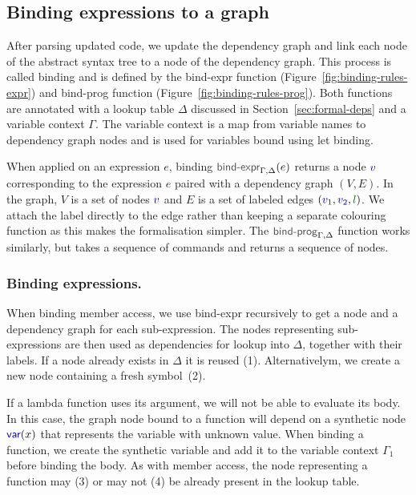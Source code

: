 \documentclass[acmsmall,anonymous,fleqn]{acmart}\settopmatter{printfolios=false,printccs=false,printacmref=false}
\theoremstyle{plain}
\theoremstyle{definition}
\newcommand{\ident}[1]{\textnormal{\textcolor{idclr}{\sffamily #1}}}
\newcommand{\kvd}[1]{\textnormal{\textcolor{kvdclr}{\sffamily #1}}}
\newcommand{\bndclr}[1]{\textcolor{kvdclr}{#1}}
\newcommand{\blblclr}[1]{\textcolor{numclr}{#1}}
\newcommand{\bnd}[1]{\textnormal{\textcolor{kvdclr}{\sffamily #1}}}
\begin{document}
\subsection{Binding expressions to a graph}
\label{sec:formal-bind}

After parsing updated code, we update the dependency graph and link each node of the abstract
syntax tree to a node of the dependency graph. This process is called
binding and is defined by the \ident{bind-expr} function (Figure~\ref{fig:binding-rules-expr})
and \ident{bind-prog} function (Figure~\ref{fig:binding-rules-prog}). Both functions are
annotated with a lookup table $\Delta$ discussed in Section~\ref{sec:formal-deps} and a variable
context $\Gamma$. The variable context is a map from variable names to dependency graph nodes and
is used for variables bound using \kvd{let} binding.

When applied on an expression $e$, binding $\ident{bind-expr}_{\Gamma,\Delta}(e)$ returns
a node $\bndclr{v}$ corresponding to the expression $e$ paired with a dependency graph $(V, E)$.
In the graph, $V$ is a set of nodes $\bndclr{v}$ and $E$ is a set of labeled edges
$(\bndclr{v_1}, \bndclr{v_2}, \blblclr{l})$. We attach the label directly to the edge rather than
keeping a separate colouring function as this makes the formalisation simpler.
The $\ident{bind-prog}_{\Gamma,\Delta}$ function works similarly, but takes a sequence of
commands and returns a sequence of nodes.

\subsubsection{Binding expressions.} When binding member access, we use \ident{bind-expr} recursively
to get a node and a dependency graph for each sub-expression. The nodes representing sub-expressions are
then used as dependencies for lookup into $\Delta$, together with their labels. If a node already
exists in $\Delta$ it is reused (1). Alternativelym, we create a new node containing a fresh symbol~(2).

If a lambda function uses its argument, we will not be able to evaluate its body. In this case, the
graph node bound to a function will depend on a synthetic node $\bnd{var}(x)$ that represents the
variable with unknown value. When binding a function, we create the synthetic variable and add it
to the variable context $\Gamma_1$ before binding the body. As with member access, the node
representing a function may (3) or may not (4) be already present in the lookup table.
\end{document}
